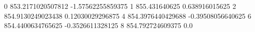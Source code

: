 0 853.2171020507812 -1.57562255859375
1 855.431640625 0.638916015625
2 854.9130249023438 0.12030029296875
4 854.3976440429688 -0.39508056640625
6 854.4400634765625 -0.3526611328125
8 854.792724609375 0.0
